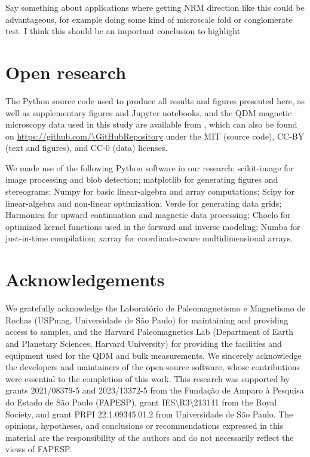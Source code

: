 Say something about applications where getting NRM direction like this could be advantageous, for example doing some kind of microscale fold or conglomerate test. I think this should be an important conclusion to highlight


\section{Open research}

The Python source code used to produce all results and figures presented here, as well as supplementary figures and Jupyter notebooks, and the QDM magnetic microscopy data used in this study are available from \citet{figshare}, which can also be found on \url{https://github.com/\GitHubRepository} under the MIT (source code), CC-BY (text and figures), and CC-0 (data) licenses.

We made use of the following Python software in our research:
scikit-image \citep{VanderWalt2014} for image processing and blob detection;
matplotlib \citep{Hunter2007} for generating figures and stereograms;
Numpy \citep{Harris2020} for basic linear-algebra and array computations;
Scipy \citep{2020SciPy-NMeth} for linear-algebra and non-linear optimization;
Verde \citep{verde2018} for generating data grids;
Harmonica \citep{harmonica2020} for upward continuation and magnetic data processing;
Choclo \citep{choclo2022} for optimized kernel functions used in the
forward and inverse modeling;
Numba \citep{lam2015numba} for just-in-time compilation;
xarray \citep{hoyer2017xarray} for coordinate-aware multidimensional arrays.

\section{Acknowledgements}

We gratefully acknowledge the Laboratório de Paleomagnetismo e Magnetismo de Rochas (USPmag, Universidade de São Paulo) for maintaining and providing access to samples, and the Harvard Paleomagnetics Lab (Department of Earth and Planetary Sciences, Harvard University) for providing the facilities and equipment used for the QDM and bulk measurements. We sincerely acknowledge the developers and maintainers of the open-source software, whose contributions were essential to the completion of this work. This research was supported by grants 2021/08379-5 and 2023/13372-5 from the Fundação de Amparo à Pesquisa do Estado de São Paulo (FAPESP), grant IES\textbackslash{}R3\textbackslash{}213141 from the Royal Society, and grant PRPI 22.1.09345.01.2 from Universidade de São Paulo.
The opinions, hypotheses, and conclusions or recommendations expressed in this material are the responsibility of the authors and do not necessarily reflect the views of FAPESP.


